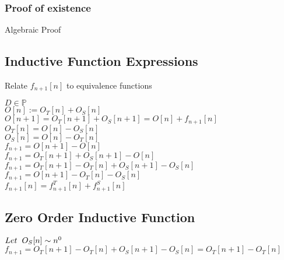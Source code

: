 \documentclass[11pt]{article}
\begin{document}
\subsubsection{Proof of existence}
Algebraic Proof




\subsection{Inductive Function Expressions}
Relate $f_{n+1}[n]$ to equivalence functions
\begin{center}
$
D \in \mathbb{P}
$
\\ \vspace{2mm}
$
O[n] := O_T[n] + O_S[n]
$
\\ \vspace{2mm}
$
O[n+1] = O_T[n+1] + O_S[n+1] = O[n] + f_{n+1}[n]
$
\\ \vspace{2mm}
$
O_T[n] = O[n] - O_S[n]
$
\\ \vspace{2mm}
$
O_S[n] = O[n] - O_T[n]
$
\\ \vspace{8mm}
$
f_{n+1} = O[n+1] - O[n]
$
\\ \vspace{2mm}
$
f_{n+1} = O_T[n+1] + O_S[n+1] - O[n]
$
\\ \vspace{2mm}
$
f_{n+1} = O_T[n+1] - O_T[n] + O_S[n+1] - O_S[n]
$
\\ \vspace{2mm}
$
f_{n+1} = O[n+1] - O_T[n] - O_S[n]
$
\\ \vspace{2mm}
$
f_{n+1}[n] =  f^T_{n+1}[n] +  f^S_{n+1}[n]
$
\end{center}






\subsection{Zero Order Inductive Function}
\begin{center}
$
Let \hspace{2mm} O_S[n] \sim n^0
$
\\ \vspace{2mm}
$
f_{n+1} = O_T[n+1] - O_T[n] + O_S[n+1] - O_S[n] = O_T[n+1] - O_T[n]
$
\end{center}
\end{document}
